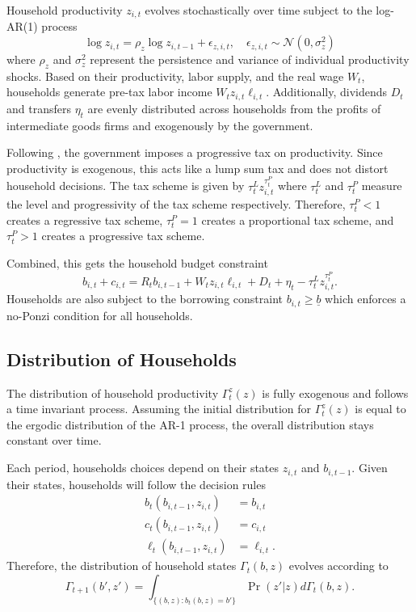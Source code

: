 Household productivity $z_{i, t}$ evolves stochastically over time subject to the log-AR(1) process
\begin{equation*}
    \log z_{i, t} = \rho_z \log z_{i, t-1} + \epsilon_{z, i, t}, \quad \epsilon_{z, i, t} \sim \mathcal{N} (0, \sigma_z^2) \label{eq:idio_prod}
\end{equation*}
where $\rho_z$ and $\sigma_z^2$ represent the persistence and variance of individual productivity shocks. Based on their productivity, labor supply, and the real wage $W_t$, households generate pre-tax labor income $W_t z_{i, t} \ell_{i, t}$. Additionally, dividends $D_t$ and transfers $\eta_t$ are evenly distributed across households from the profits of intermediate goods firms and exogenously by the government.

Following \textcite{mckay2016power}, the government imposes a progressive tax on productivity. Since productivity is exogenous, this acts like a lump sum tax and does not distort household decisions. The tax scheme is given by $\tau_t^L z_{i, t}^{\tau_t^P}$ where $\tau_t^L$ and $\tau_t^P$ measure the level and progressivity of the tax scheme respectively. Therefore, $\tau_t^P < 1$ creates a regressive tax scheme, $\tau_t^P = 1$ creates a proportional tax scheme, and $\tau_t^P > 1$ creates a progressive tax scheme.

Combined, this gets the household budget constraint
\begin{equation*}
    b_{i, t} + c_{i, t} = R_t b_{i, t-1} + W_t z_{i, t} \ell_{i, t} + D_t + \eta_t - \tau_t^L z_{i, t}^{\tau_t^P}.
\end{equation*}
Households are also subject to the borrowing constraint $b_{i, t} \geq \underline{b}$ which enforces a no-Ponzi condition for all households.


\subsection{Distribution of Households}

The distribution of household productivity $\Gamma_t^z (z)$ is fully exogenous and follows a time invariant process. Assuming the initial distribution for $\Gamma_t^z (z)$ is equal to the ergodic distribution of the AR-1 process, the overall distribution stays constant over time.

Each period, households choices depend on their states $z_{i, t}$ and $b_{i, t - 1}$. Given their states, households will follow the decision rules
\begin{align*}
    b_t (b_{i, t-1}, z_{i, t}) &= b_{i, t} \\
    c_t (b_{i, t-1}, z_{i, t}) &= c_{i, t} \\
    \ell_t (b_{i, t-1}, z_{i, t}) &= \ell_{i, t}.
\end{align*}
Therefore, the distribution of household states $\Gamma_t (b, z)$ evolves according to
\begin{equation*}
    \Gamma_{t + 1} (b', z') = \int_{\{(b, z) : b_t(b, z) = b'\}} \Pr (z' | z) d \Gamma_t (b, z).
\end{equation*}



